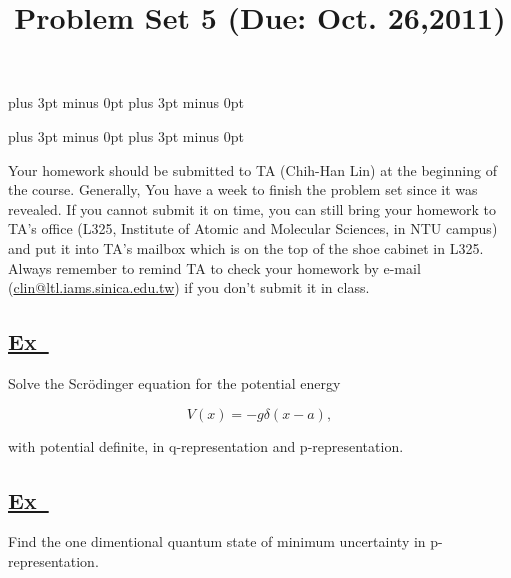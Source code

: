 \documentclass[a4paper,12pt]{article}
\newcommand{\excercise}{\addtocounter{section}{+1}
\subsection*{\underline{Ex~\thesection}}}
\begin{document}
\abovedisplayskip=-6pt plus 3pt minus 0pt
\belowdisplayskip=8pt plus 3pt minus 0pt

\abovedisplayshortskip=-6pt plus 3pt minus 0pt
\belowdisplayshortskip=8pt plus 3pt minus 0pt

\title{Problem Set 5 (Due: Oct. 26,2011)}
\maketitle

Your homework should be submitted to TA (Chih-Han Lin) at the  beginning of the course. Generally, You have a week to finish the problem set since it was revealed. If you cannot submit it on time, you can still bring your homework to TA's office (L325, Institute of Atomic and Molecular Sciences, in NTU campus) and put it into TA's mailbox which is on the top of the shoe cabinet in L325. Always remember to remind TA to check your homework by e-mail (\url{clin@ltl.iams.sinica.edu.tw}) if you don't submit it in class.

%

\excercise
Solve the Scr\"{o}dinger equation for the potential energy 

$$
V(x)=-g\delta(x-a),
$$

\noindent with potential definite, in q-representation and p-representation.


\excercise

Find the one dimentional quantum state of minimum uncertainty in p-representation.
\end{document}

